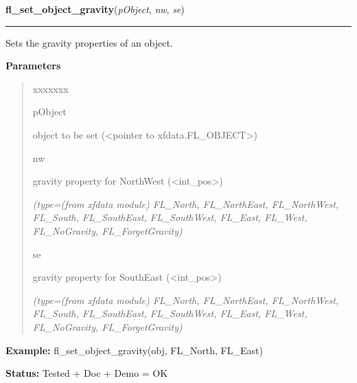 \hspace{.8\funcindent}\begin{boxedminipage}{\funcwidth}

    \raggedright \textbf{fl\_set\_object\_gravity}(\textit{pObject}, \textit{nw}, \textit{se})

    \vspace{-1.5ex}

    \rule{\textwidth}{0.5\fboxrule}
\setlength{\parskip}{2ex}
    Sets the gravity properties of an object.

\setlength{\parskip}{1ex}
      \textbf{Parameters}
      \vspace{-1ex}

      \begin{quote}
        \begin{Ventry}{xxxxxxx}

          \item[pObject]

          object to be set ({\textless}pointer to 
          xfdata.FL\_OBJECT{\textgreater})

          \item[nw]

          gravity property for NorthWest 
          ({\textless}int\_pos{\textgreater})

            {\it (type=(from xfdata module) FL\_North, FL\_NorthEast, FL\_NorthWest, FL\_South, 
FL\_SouthEast, FL\_SouthWest, FL\_East, FL\_West, FL\_NoGravity, 
FL\_ForgetGravity)}

          \item[se]

          gravity property for SouthEast 
          ({\textless}int\_pos{\textgreater})

            {\it (type=(from xfdata module) FL\_North, FL\_NorthEast, FL\_NorthWest, FL\_South, 
FL\_SouthEast, FL\_SouthWest, FL\_East, FL\_West, FL\_NoGravity, 
FL\_ForgetGravity)}

        \end{Ventry}

      \end{quote}

\textbf{Example:} fl\_set\_object\_gravity(obj, FL\_North, FL\_East)



\textbf{Status:} Tested + Doc + Demo = OK



    \end{boxedminipage}

